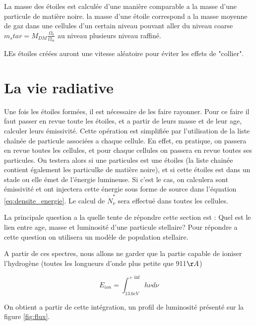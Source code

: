 La masse des étoiles est calculée d'une manière comparable a la masse d'une particule de matière noire.
la masse d'une étoile correspond a la masse moyenne de gaz dans une cellules d'un certain niveau pouvant aller du niveau coarse $m_star = M_{DM} \frac{\Omega_b}{\Omega_m}$ au niveau plusieurs niveau raffiné.


LEs étoiles créées auront une vitesse aléatoire pour éviter les effets de "collier".




\section{La vie radiative}

Une fois les étoiles formées, il est nécessaire de les faire rayonner.
Pour ce faire il faut passer en revue toute les étoiles, et a partir de leurs masse et de leur age, calculer leurs émissivité.
Cette opération est simplifiée par l'utilisation de la liste chaînée de particule associées a chaque cellule. %
En effet, en pratique, on passera en revue toutes les cellules, et pour chaque cellules on passera en revue toutes ses particules.
On testera alors si une particules est une étoiles (la liste chainée contient également les particulke de matière noire), et si cette étoiles est dans un stade ou elle émet de l'énergie lumineuse.
Si c'est le cas, on calculera sont émissivité et ont injectera cette énergie sous forme de source dans l'équation \ref{eq:densite_energie}.
Le calcul de $\dot{N}_\nu^*$ sera effectué dans toutes les cellules.

La principale question a la quelle tente de répondre cette section est : Quel est le lien entre age, masse et luminosité d'une particule stellaire?
Pour répondre a cette question on utilisera un modèle de population stellaire.


A partir de ces spectres, nous allons ne garder que la partie capable de ioniser l'hydrogène (toutes les longueurs d'onde plus petite que 911$\AA$) 



\begin{equation}
E_{ion} = \int_{13.6eV}^{+\inf} h \nu d\nu
\end{equation}

On obtient a partir de cette intégration, un profil de luminosité présenté sur la figure \ref{fig:flux}.

